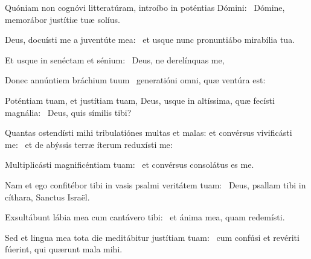\item Quóniam non cognóvi litteratúram, introíbo in poténtias Dómini:~\psstar{} Dómine, memorábor justítiæ tuæ solíus.

\item Deus, docuísti me a juventúte mea:~\psstar{} et usque nunc pronuntiábo mirabília tua.

\item Et usque in senéctam et sénium:~\psstar{} Deus, ne derelínquas me,

\item Donec annúntiem bráchium tuum~\psstar{} generatióni omni, quæ ventúra est:

\item Poténtiam tuam, et justítiam tuam, Deus, usque in altíssima, quæ fecísti magnália:~\psstar{} Deus, quis símilis tibi?

\item Quantas ostendísti mihi tribulatiónes multas et malas: et convérsus vivificásti me:~\psstar{} et de abýssis terræ íterum reduxísti me:

\item Multiplicásti magnificéntiam tuam:~\psstar{} et convérsus consolátus es me.

\item Nam et ego confitébor tibi in vasis psalmi veritátem tuam:~\psstar{} Deus, psallam tibi in cíthara, Sanctus Israël.

\item Exsultábunt lábia mea cum cantávero tibi:~\psstar{} et ánima mea, quam redemísti.

\item Sed et lingua mea tota die meditábitur justítiam tuam:~\psstar{} cum confúsi et revériti fúerint, qui quærunt mala mihi.